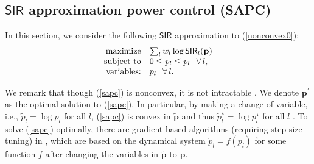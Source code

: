 \documentclass[10pt,twocolumn]{IEEEtran}
\newcommand{\0}{\mathbf{0}}
\newcommand{\1}{\mathbf{1}}
\begin{document}
%

\subsection{$\mathsf{SIR}$ approximation power control (SAPC)}
In this section, we consider the following $\mathsf{SIR}$ approximation to (\ref{nonconvex0}):
\begin{equation}
\label{sapc}
\begin{array}
[c]{rl}
\mbox{maximize} & \sum_l w_l \log\mathsf{SIR}_l(\mathbf{p})\\
\mbox{subject to} & 0 \le p_l \le \bar{p}_l \,\;\; \forall \, l, \\
\mbox{variables:} & p_l \,\;\; \forall \, l.
\end{array}
\end{equation}

We remark that though (\ref{sapc}) is nonconvex, it is not intractable \cite{Chiang07,Chiang05,Stanczak07}. We denote $\mathbf{p}^{\prime}$ as the optimal solution to (\ref{sapc}). In particular, by making a change of variable, i.e., $\tilde{p}_l=\log p_l$ for all $l$, (\ref{sapc}) is convex in $\tilde{\mathbf{p}}$ and thus $\tilde{p}^{\star}_l=\log p^{\star}_l$ for all $l$ \cite{Chiang05}. To solve (\ref{sapc}) optimally, there are gradient-based algorithms (requiring step size tuning) in \cite{Chiang05,Stanczak07}, which are based on the dynamical system $\dot{p}_l=f(p_l)$ for some function $f$ after changing the variables in $\mathbf{\tilde{p}}$ to $\mathbf{p}$.
\end{document}
